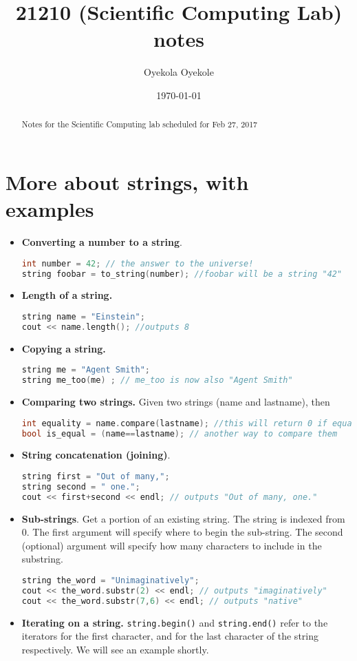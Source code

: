 \documentclass[9pt]{amsart}
\begin{document}
\title{21210 (Scientific Computing Lab) notes}
\author{Oyekola Oyekole}
\date{\today}
\maketitle

\begin{abstract}
    Notes for the Scientific Computing lab scheduled for Feb 27, 2017
\end{abstract}


\section{More about strings, with examples\ }
\begin{itemize}
\item \textbf{Converting a number to a string}. 
\begin{lstlisting}[language=C++]
int number = 42; // the answer to the universe!
string foobar = to_string(number); //foobar will be a string "42"
\end{lstlisting}
\item \textbf{Length of a string.}\coded{}
\begin{lstlisting}[language=C++]
string name = "Einstein";
cout << name.length(); //outputs 8
\end{lstlisting}
\item \textbf{Copying a string.}
\begin{lstlisting}[language=C++]
string me = "Agent Smith";
string me_too(me) ; // me_too is now also "Agent Smith"
\end{lstlisting}
\item \textbf{Comparing two strings.} Given two strings (name and lastname), then
\begin{lstlisting}[language=C++]
int equality = name.compare(lastname); //this will return 0 if equal
bool is_equal = (name==lastname); // another way to compare them
\end{lstlisting}
\item \textbf{String concatenation (joining)}.
\begin{lstlisting}[language=C++]
string first = "Out of many,";
string second = " one.";
cout << first+second << endl; // outputs "Out of many, one."
\end{lstlisting}
\item \textbf{Sub-strings}. Get a portion of an existing string.
The string is indexed from 0. The first argument will specify where to begin the sub-string. The second (optional) argument will specify how many characters to include in the substring.
\begin{lstlisting}[language=C++]
string the_word = "Unimaginatively";
cout << the_word.substr(2) << endl; // outputs "imaginatively"
cout << the_word.substr(7,6) << endl; // outputs "native"
\end{lstlisting}
\item \textbf{Iterating on a string.}
\verb$string.begin()$ and \verb$string.end()$ refer to the iterators for the first character, and for the last character of the string respectively. We will see an example shortly. 
\end{itemize}
\end{document}
